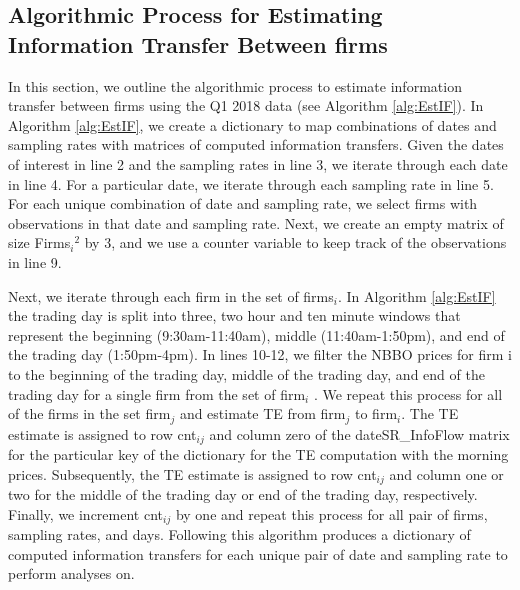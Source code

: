 
\subsection{Algorithmic Process for Estimating Information Transfer Between firms}

In this section, we outline the algorithmic process to estimate information transfer between firms using the Q1 2018 data (see Algorithm \ref{alg:EstIF}).  In Algorithm \ref{alg:EstIF},  we create a dictionary to map combinations of dates and sampling rates with matrices of computed information transfers.  Given the dates of interest in line 2 and the sampling rates in line 3, we iterate through each date in line 4.  For a particular date, we iterate through each sampling rate in line 5.  For each unique combination of date and sampling rate, we select firms with observations in that date and sampling rate. Next, we create an empty matrix of size Firms\(_i\)\(^2\) by 3, and we use a counter variable to keep track of the observations in line 9. 

Next, we iterate through each firm in the set of firms\(_i\).  In Algorithm \ref{alg:EstIF} the trading day is split into three,  two hour and ten minute windows that represent the beginning (9:30am-11:40am),  middle (11:40am-1:50pm),  and end of the trading day (1:50pm-4pm).  In lines 10-12, we filter the NBBO prices for firm i to the beginning of the trading day,  middle of the trading day, and end of the trading day for a single firm from the set of firm\(_i\) . We repeat this process for all of the firms in the set firm\(_j\) and estimate TE from firm\(_j\) to firm\(_i\).   The TE estimate is assigned to row cnt\(_{ij}\) and column zero of the dateSR\_InfoFlow matrix for the particular key of the dictionary for the TE computation with the morning prices.  Subsequently, the TE estimate is assigned to row cnt\(_{ij}\) and column one or two for the middle of the trading day or end of the trading day, respectively.   Finally, we increment cnt\(_{ij}\) by one and repeat this process for all pair of firms, sampling rates, and days.  Following this algorithm produces a dictionary of computed information transfers for each unique pair of date and sampling rate to perform analyses on.  \\

